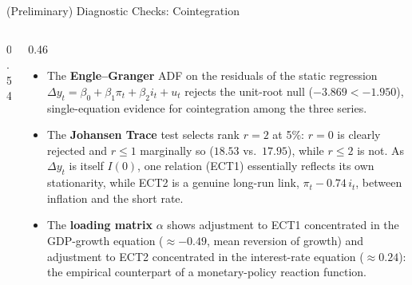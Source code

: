 \documentclass[9pt]{beamer}
\begin{document}
\begin{frame}{(Preliminary) Diagnostic Checks: Cointegration}
\label{slide:cointegration}
\footnotesize

\begin{columns}

  \begin{column}{0.54\textwidth}
    {\fontsize{5.5}{6}\selectfont
    \setlength{\tabcolsep}{2.5pt}
    \setlength{\abovecaptionskip}{2pt}
    \setlength{\belowcaptionskip}{1pt}
    
    \vspace{0.1cm}
    
    \vspace{0.1cm}
    
    }
  \end{column}

  \begin{column}{0.46\textwidth}
    \footnotesize
    \begin{itemize}\setlength{\itemsep}{2pt}\setlength{\parskip}{0pt}
      \item The \textbf{Engle--Granger} ADF on the residuals of the static regression $\Delta y_t = \beta_0 + \beta_1 \pi_t + \beta_2 i_t + u_t$ rejects the unit-root null ($-3.869 < -1.950$), single-equation evidence for cointegration among the three series.

      \item The \textbf{Johansen Trace} test selects rank $r=2$ at 5\%: $r=0$ is clearly rejected and $r \leq 1$ marginally so ($18.53$ vs.\ $17.95$), while $r \leq 2$ is not. As $\Delta y_t$ is itself $I(0)$, one relation (ECT1) essentially reflects its own stationarity, while ECT2 is a genuine long-run link, $\pi_t - 0.74\,i_t$, between inflation and the short rate.

      \item The \textbf{loading matrix} $\alpha$ shows adjustment to ECT1 concentrated in the GDP-growth equation ($\approx -0.49$, mean reversion of growth) and adjustment to ECT2 concentrated in the interest-rate equation ($\approx 0.24$): the empirical counterpart of a monetary-policy reaction function.
    \end{itemize}
  \end{column}

\end{columns}

\end{frame}
\end{document}

